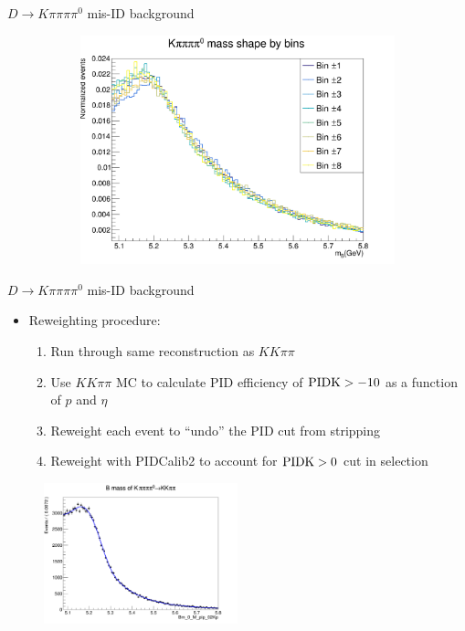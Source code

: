 \documentclass{beamer}
\begin{document}
\begin{frame}{$D\to K\pi\pi\pi\pi^0$ mis-ID background}
\begin{figure}
\begin{subfigure}{0.50\textwidth}
      \includegraphics[width = 1.0\textwidth]{Plots/Kpipipipi0_mass_shape_by_bins.png}
    \end{subfigure}
  \end{figure}
\end{frame}

\begin{frame}{$D\to K\pi\pi\pi\pi^0$ mis-ID background}
  \begin{itemize}
    \setlength\itemsep{0.5em}
    \item{Reweighting procedure:}
    \begin{enumerate}
      \item{Run through same reconstruction as $KK\pi\pi$}
      \item{Use $KK\pi\pi$ MC to calculate PID efficiency of $\rm{PIDK} > -10$ as a function of $p$ and $\eta$}
      \item{Reweight each event to ``undo'' the PID cut from stripping}
      \item{Reweight with PIDCalib2 to account for $\rm{PIDK} > 0$ cut in selection}
    \end{enumerate}
  \end{itemize}
  \begin{figure}
    \includegraphics[width = 0.5\textwidth]{Plots/Kpipipipi0BMassB2DpiD2Kpipipi.png}
  \end{figure}
\end{frame}
\end{document}
